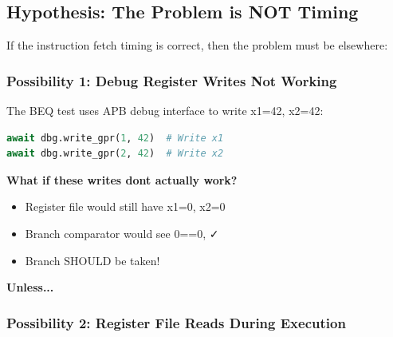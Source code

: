 \subsection{Hypothesis: The Problem is NOT Timing}\label{cr:fix:timing-analysis:hypothesis-the-problem-is-not-timing}

\begin{record}

If the instruction fetch timing is correct, then the problem must be
elsewhere:

\end{record}

\subsubsection{\texorpdfstring{Possibility 1: Debug Register Writes Not
Working \warn{}}{Possibility 1: Debug Register Writes Not Working }}\label{cr:fix:timing-analysis:possibility-1-debug-register-writes-not-working-warning}

\begin{record}

The BEQ test uses APB debug interface to write x1=42, x2=42:

\begin{lstlisting}[language=Python]
await dbg.write_gpr(1, 42)  # Write x1
await dbg.write_gpr(2, 42)  # Write x2
\end{lstlisting}

\textbf{What if these writes don\textquotesingle t actually work?}

\begin{itemize}
\tightlist
\item
  Register file would still have x1=0, x2=0
\item
  Branch comparator would see 0==0,  ✓
\item
  Branch SHOULD be taken!
\end{itemize}

\textbf{Unless...}

\end{record}

\subsubsection{\texorpdfstring{Possibility 2: Register File Reads During
Execution
\warn{}}{Possibility 2: Register File Reads During Execution }}\label{cr:fix:timing-analysis:possibility-2-register-file-reads-during-execution-warning}

